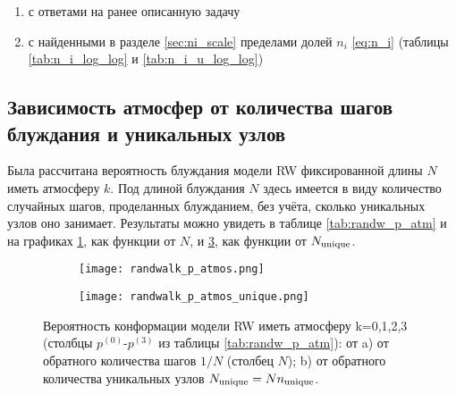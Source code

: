 \begin{enumerate}
\item с ответами на ранее описанную задачу \cite{Spitser1969}
\item с найденными в разделе \ref{sec:ni_scale} пределами долей $n_i$ \eqref{eq:n_i} (таблицы \ref{tab:n_i_log_log} и \ref{tab:n_i_u_log_log})
\end{enumerate}

\newpage

\subsection{Зависимость атмосфер от количества шагов блуждания и уникальных узлов}

Была рассчитана вероятность блуждания модели RW фиксированной длины $N$ иметь атмосферу $k$. 
Под длиной блуждания $N$ здесь имеется в виду количество случайных шагов, проделанных блужданием, без учёта, сколько уникальных узлов оно занимает.
Результаты можно увидеть в таблице \ref{tab:randw_p_atm} и на графиках \ref{fig:randw_p_atm}, как функции от $N$, и \ref{fig:randw_p_atm_u}, как функции от $N_{\textup{unique}}$.

\begin{figure}[h]
    
\begin{subfigure}{0.49\textwidth}
\texttt{[image: randwalk\_p\_atmos.png]}
\caption{}
\label{fig:randw_p_atm}
\end{subfigure}
\hfill
\begin{subfigure}{0.49\textwidth}
\texttt{[image: randwalk\_p\_atmos\_unique.png]}
\caption{}
\label{fig:randw_p_atm_u}
\end{subfigure}
\caption{Вероятность конформации модели RW  иметь атмосферу k=0,1,2,3  (столбцы $p^{(0)}$-$p^{(3)}$ из таблицы \ref{tab:randw_p_atm}): от a) от обратного количества шагов $1/N$ (столбец $N$); b) от обратного количества уникальных узлов $N_{\textup{unique}} = Nn_{\textup{unique}}$.}
\end{figure} 

